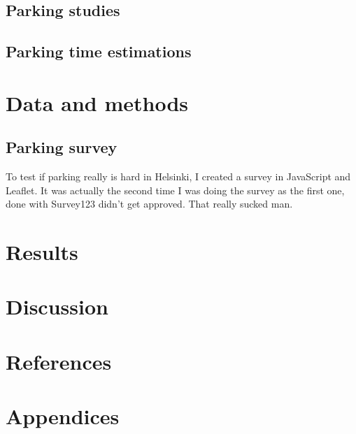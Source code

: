 \documentclass[a4paper,11pt]{article}
\begin{document}
\subsection{Parking studies}
\subsection{Parking time estimations}

\newpage
\section{Data and methods}
\subsection{Parking survey}
\justify
To test if parking really is hard in Helsinki, I created a survey in JavaScript and Leaflet. It was actually the second time I was doing the survey as the first one, done with Survey123 didn't get approved. That really sucked man.

\newpage
\section{Results}

\newpage
\section{Discussion}

\newpage
\label{myLastPage} %
\section{References}
\renewcommand{\refname}{}


\newpage
{} %
\section{Appendices}
\end{document}
